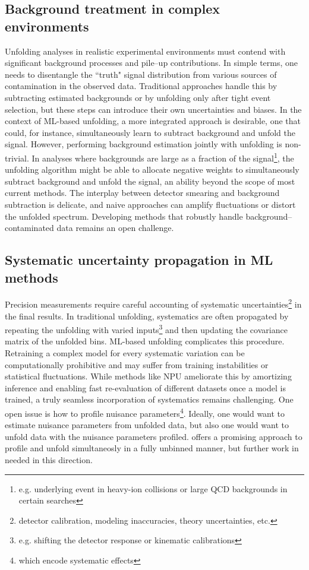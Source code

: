     \subsection{Background treatment in complex environments}
        Unfolding analyses in realistic experimental environments must contend with significant background processes and pile--up contributions.
        In simple terms, one needs to disentangle the ``truth" signal distribution from various sources of contamination in the observed data.
        Traditional approaches handle this by subtracting estimated backgrounds or by unfolding only after tight event selection, but these steps can introduce their own uncertainties and biases.
        In the context of ML-based unfolding, a more integrated approach is desirable, one that could, for instance, simultaneously learn to subtract background and unfold the signal.
        However, performing background estimation jointly with unfolding is non-trivial.
        In analyses where backgrounds are large as a fraction of the signal\footnote{e.g. underlying event in heavy-ion collisions or large QCD backgrounds in certain searches}, the unfolding algorithm might be able to allocate negative weights to simultaneously subtract background and unfold the signal, an ability beyond the scope of most current methods.
        The interplay between detector smearing and background subtraction is delicate, and naive approaches can amplify fluctuations or distort the unfolded spectrum.
        Developing methods that robustly handle background--contaminated data remains an open challenge.
    \subsection{Systematic uncertainty propagation in ML methods}
        Precision measurements require careful accounting of systematic uncertainties\footnote{detector calibration, modeling inaccuracies, theory uncertainties, etc.} in the final results.
        In traditional unfolding, systematics are often propagated by repeating the unfolding with varied inputs\footnote{e.g. shifting the detector response or kinematic calibrations} and then updating the covariance matrix of the unfolded bins.
        ML-based unfolding complicates this procedure.
        Retraining a complex model for every systematic variation can be computationally prohibitive and may suffer from training instabilities or statistical fluctuations.
        While methods like NPU ameliorate this by amortizing inference and enabling fast re-evaluation of different datasets once a model is trained, a truly seamless incorporation of systematics remains challenging.
        One open issue is how to profile nuisance parameters\footnote{which encode systematic effects}.
        Ideally, one would want to estimate nuisance parameters from unfolded data, but also one would want to unfold data with the nuisance parameters profiled.
         offers a promising approach to profile and unfold simultaneosly in a fully unbinned manner, but further work in needed in this direction.

